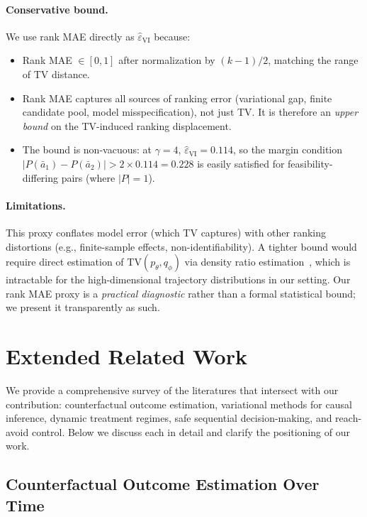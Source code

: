 \documentclass{article}
\newcommand{\TV}{\mathrm{TV}}
\newcommand{\ba}{\bar{a}}
\begin{document}
\paragraph{Conservative bound.} We use rank MAE directly as $\hat{\varepsilon}_{\mathrm{VI}}$ because:
\begin{itemize}
    \item Rank MAE $\in [0, 1]$ after normalization by $(k-1)/2$, matching the range of TV distance.
    \item Rank MAE captures all sources of ranking error (variational gap, finite candidate pool, model misspecification), not just TV. It is therefore an \emph{upper bound} on the TV-induced ranking displacement.
    \item The bound is non-vacuous: at $\gamma = 4$, $\hat{\varepsilon}_{\mathrm{VI}} = 0.114$, so the margin condition $|P(\ba_1) - P(\ba_2)| > 2 \times 0.114 = 0.228$ is easily satisfied for feasibility-differing pairs (where $|P| = 1$).
\end{itemize}

\paragraph{Limitations.} This proxy conflates model error (which TV captures) with other ranking distortions (e.g., finite-sample effects, non-identifiability). A tighter bound would require direct estimation of $\TV(p_\theta, q_\phi)$ via density ratio estimation~\citep{sugiyama2012density}, which is intractable for the high-dimensional trajectory distributions in our setting. Our rank MAE proxy is a \emph{practical diagnostic} rather than a formal statistical bound; we present it transparently as such.


\section{Extended Related Work}
\label{app:extended_related_work}

We provide a comprehensive survey of the literatures that intersect with our contribution: counterfactual outcome estimation, variational methods for causal inference, dynamic treatment regimes, safe sequential decision-making, and reach-avoid control. Below we discuss each in detail and clarify the positioning of our work.

\subsection{Counterfactual Outcome Estimation Over Time}
\end{document}
